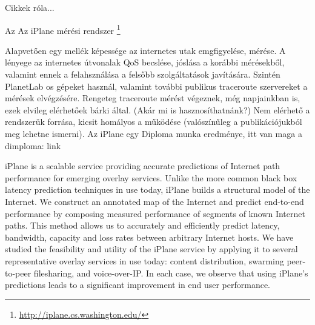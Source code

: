 Cikkek róla...

Az Az iPlane mérési rendszer \footnote{\url{http://iplane.cs.washington.edu/}}


Alapvetően egy mellék képessége az internetes utak  emgfigyelése, mérése. A lényege az internetes útvonalak QoS becslése, jóslása a korábbi mérésekből, valamint ennek a felahsználása a felsőbb szolgáltatások javítására. Szintén PlanetLab os gépeket használ, valamint további publikus traceroute szervereket a mérések elvégzésére.
Rengeteg traceroute mérést végeznek, még napjainkban is, ezek elvileg elérhetőek bárki által. (Akár mi is hasznosíthatnánk?)
Nem elérhető a rendszerük forrása, kicsit homályos a működése (valószínűleg a publikációjukból meg lehetne ismerni).
Az iPlane egy Diploma  munka eredménye, itt van maga a dimploma: link

	iPlane is a scalable service providing accurate predictions of Internet path performance for emerging overlay services. Unlike the more common black box latency prediction techniques in use today, iPlane builds a structural model of the Internet. We construct an annotated map of the Internet and predict end-to-end performance by composing measured performance of segments of known Internet paths. This method allows us to accurately and efficiently predict latency, bandwidth, capacity and loss rates between arbitrary Internet hosts. We have studied the feasibility and utility of the iPlane service by applying it to several representative overlay services in use today: content distribution, swarming peer-to-peer filesharing, and voice-over-IP. In each case, we observe that using iPlane's predictions leads to a significant improvement in end user performance. 
